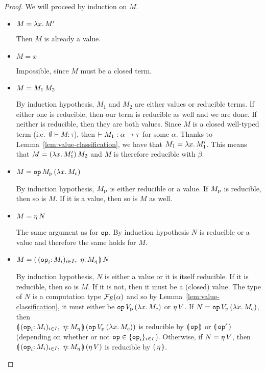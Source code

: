 \begin{proof}
  We will proceed by induction on $M$.

  \begin{itemize}
  \item $M = \lambda x.\, M'$

    Then $M$ is already a value.

  \item $M = x$

    Impossible, since $M$ must be a closed term.

  \item $M = M_1\,M_2$

    By induction hypothesis, $M_1$ and $M_2$ are either values or reducible
    terms. If either one is reducible, then our term is reducible as well
    and we are done. If neither is reducible, then they are both
    values. Since $M$ is a closed well-typed term (i.e.\
    $\emptyset \vdash M : \tau$), then
    $\empty \vdash M_1 : \alpha \to \tau$ for some $\alpha$. Thanks to
    Lemma~\ref{lem:value-classification}, we have that
    $M_1 = \lambda x.\, M_1'$. This means that $M = (\lambda x.\, M_1')\,M_2$
    and $M$ is therefore reducible with $\beta$.

  \item $M = \mathtt{op}\,M_{\mathrm{p}}\,(\lambda x.\, M_{\mathrm{c}})$

    By induction hypothesis, $M_{\mathrm{p}}$ is either reducible or a value. If
    $M_{\mathrm{p}}$ is reducible, then so is $M$. If it is a value, then so is
    $M$ as well.

  \item $M = \eta\,N$

    The same argument as for $\mathtt{op}$. By induction hypothesis $N$ is
    reducible or a value and therefore the same holds for $M$.

  \item $M = \ap{\cibanana}{N}$

    By induction hypothesis, $N$ is either a value or it is itself
    reducible. If it is reducible, then so is $M$. If it is not, then it
    must be a (closed) value. The type of $N$ is a computation type
    $\mathcal{F}_E(\alpha)$ and so by Lemma~\ref{lem:value-classification}, it must
    either be $\mathtt{op}\,V_{\mathrm{p}}\,(\lambda x.\, M_{\mathrm{c}})$ or
    $\eta\,V$. If $N = \mathtt{op}\,V_{\mathrm{p}}\,(\lambda x.\, M_{\mathrm{c}})$,
    then \\ $\ap{\cibanana}{(\app{\op{op}}{V_\petitp}{(\lam{x}{M_\petitc})})}$
    is reducible by $\llparenthesis \, \mathtt{op} \, \rrparenthesis$ or $\llparenthesis \, \mathtt{op}' \, \rrparenthesis$ (depending on
    whether or not $\mathtt{op} \in \{\mathtt{op}_i\}_{i \in I}$). Otherwise, if
    $N = \eta\,V$, then $\ap{\cibanana}{(\etaE{V})}$ is reducible by
    $\llparenthesis \, \eta \, \rrparenthesis$.


\end{itemize}
\end{proof}
